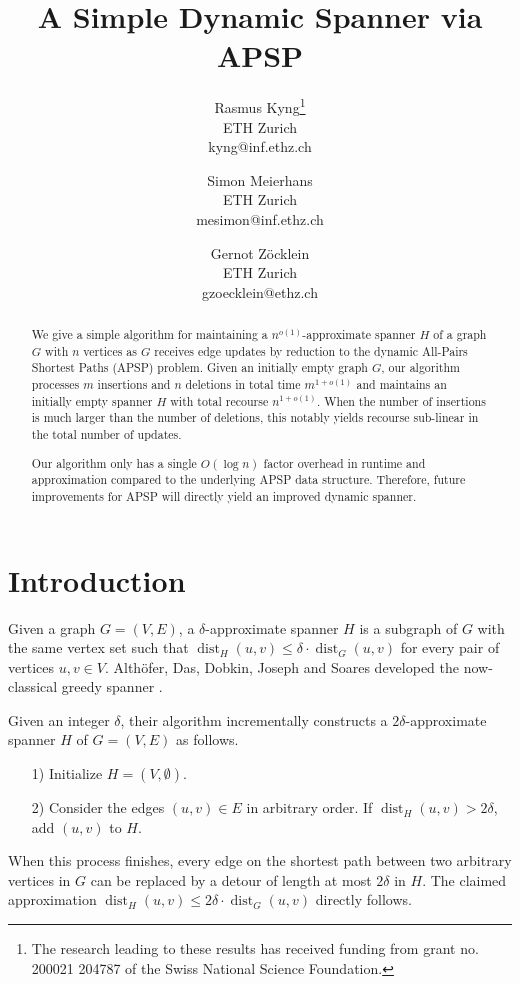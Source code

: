 \documentclass[11pt]{article}
\title{A Simple Dynamic Spanner via APSP}
\author{Rasmus Kyng\thanks{The research leading to these results has received funding from grant no. 200021 204787 of the Swiss National Science Foundation.} \\ ETH Zurich \\kyng@inf.ethz.ch \and Simon Meierhans\samethanks[1] \\ ETH Zurich \\ mesimon@inf.ethz.ch \and Gernot Zöcklein \\ ETH Zurich \\gzoecklein@ethz.ch}
\DeclareMathOperator{\dist}{dist}
\begin{document}
\maketitle

\begin{abstract}
    We give a simple algorithm for maintaining a $n^{o(1)}$-approximate spanner $H$ of a graph $G$ with $n$ vertices as $G$ receives edge updates by reduction to the dynamic All-Pairs Shortest Paths (APSP) problem. Given an initially empty graph $G$, our algorithm processes $m$ insertions and $n$ deletions in total time $m^{1 + o(1)}$ and maintains an initially empty spanner $H$ with total recourse $n^{1 + o(1)}$. When the number of insertions is much larger than the number of deletions, this notably yields recourse sub-linear in the total number of updates. 
    
    Our algorithm only has a single $O(\log n)$ factor overhead in runtime and approximation compared to the underlying APSP data structure. Therefore, future improvements for APSP will directly yield an improved dynamic spanner.  
    
    

\end{abstract}

\section{Introduction}

Given a graph $G = (V, E)$, a $\delta$-approximate spanner $H$ is  a subgraph of $G$ with the same vertex set such that $\dist_H(u, v) \leq \delta \cdot \dist_G(u, v)$ for every pair of vertices $u, v \in V$. Althöfer, Das, Dobkin, Joseph and Soares developed the now-classical greedy spanner \cite{althofer1993spars}. 

Given an integer $\delta$, their algorithm incrementally constructs a $2\delta$-approximate spanner $H$ of $G = (V, E)$ as follows.
\begin{itemize}
    \item[1)] Initialize $H = (V, \emptyset)$.
    \item[2)] Consider the edges $(u, v) \in E$ in arbitrary order. If $\dist_H(u, v) > 2 \delta$, add $(u, v)$ to $H$. 
\end{itemize}
When this process finishes, every edge on the shortest path between two arbitrary vertices in $G$ can be replaced by a detour of length at most $2 \delta$ in $H$. The claimed approximation $\dist_H(u, v) \leq 2\delta \cdot \dist_G(u, v)$ directly follows. 
\end{document}
